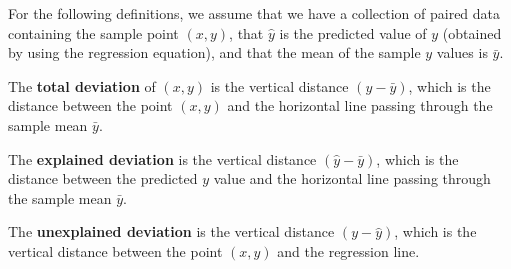 \documentclass{beamer}
\begin{document}
\begin{frame}\small
\begin{note}
For the following definitions, we assume that we have a collection of paired data containing the sample point $(x,y)$, that $\hat{y}$ is the predicted value of $y$ (obtained by using the regression equation), and that the mean of the sample $y$ values is $\bar{y}$.
\end{note}\pause

\begin{definition}
The \textbf{total deviation} of $(x,y)$ is the vertical distance $(y-\bar{y})$, which is the distance between the point $(x,y)$ and the horizontal line passing through the sample mean $\bar{y}$.
\end{definition}\pause

\begin{definition}
The \textbf{explained deviation} is the vertical distance $(\hat{y}-\bar{y})$, which is the distance between the predicted $y$ value and the horizontal line passing through the sample mean $\bar{y}$.
\end{definition}\pause

\begin{definition}
The \textbf{unexplained deviation} is the vertical distance $(y-\hat{y})$, which is the vertical distance between the point $(x,y)$ and the regression line.
\end{definition}
\end{frame}
\end{document}
